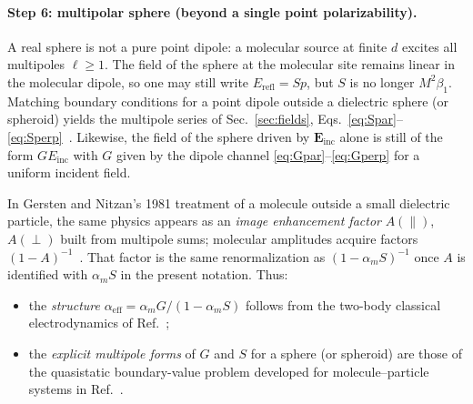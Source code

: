 \documentclass[11pt,a4paper]{article}
\begin{document}
\paragraph{Step 6: multipolar sphere (beyond a single point polarizability).}
A real sphere is not a pure point dipole: a molecular source at finite $d$
excites all multipoles $\ell\ge 1$.  The field of the sphere at the molecular
site remains linear in the molecular dipole, so one may still write
$E_{\mathrm{refl}}=S p$, but $S$ is no longer $M^2\beta_1$.  Matching boundary
conditions for a point dipole outside a dielectric sphere (or spheroid) yields
the multipole series of Sec.~\ref{sec:fields},
Eqs.~\eqref{eq:Spar}--\eqref{eq:Sperp}~\citep{gersten1981,ruppin1982,novotny2012}.
Likewise, the field of the sphere driven by $\mathbf{E}_{\mathrm{inc}}$ alone is
still of the form $G E_{\mathrm{inc}}$ with $G$ given by the dipole channel
\eqref{eq:Gpar}--\eqref{eq:Gperp} for a uniform incident field.

In Gersten and Nitzan's 1981 treatment of a molecule outside a small dielectric
particle, the same physics appears as an \emph{image enhancement factor}
$A(\parallel)$, $A(\perp)$ built from multipole sums; molecular amplitudes
acquire factors $(1-A)^{-1}$~\citep{gersten1981}.  That factor is the same
renormalization as $(1-\alpha_m S)^{-1}$ once $A$ is identified with
$\alpha_m S$ in the present notation.  Thus:
\begin{itemize}[leftmargin=1.4em]
  \item the \emph{structure} $\alpha_{\mathrm{eff}}=\alpha_m G/(1-\alpha_m S)$
        follows from the two-body classical electrodynamics of
        Ref.~;
  \item the \emph{explicit multipole forms} of $G$ and $S$ for a sphere (or
        spheroid) are those of the quasistatic boundary-value problem developed
        for molecule--particle systems in Ref.~.
\end{itemize}
\end{document}
